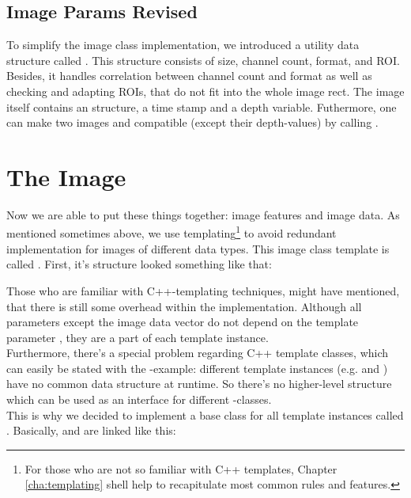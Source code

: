 \subsection {Image Params Revised}
To simplify the image class implementation, we introduced a utility data structure called  . This structure consists of size, channel count, format, and ROI. Besides, it handles correlation between channel count and format as well as checking and adapting ROIs, that do not fit into the whole image rect. The image itself contains an  structure, a time stamp and a depth variable. Futhermore, one can make two images  and  compatible (except their depth-values) by calling .


\section{The Image}
Now we are able to put these things together: image features and image data. As mentioned sometimes above, we use templating\footnote{For those who are not so familiar with C++ templates, Chapter \ref{cha:templating} shell help to recapitulate most common rules and features.} to avoid redundant implementation for images of different data types. This image class template is called  . First, it's structure looked something like that:


Those who are familiar with C++-templating techniques, might have mentioned, that there is still some overhead within the implementation. Although all parameters except the image data vector do not depend on the template parameter , they are a part of each template instance.\\
Furthermore, there's a special problem regarding C++ template classes, which can easily be stated with the -example: different template instances (e.g.  and ) have no common data structure at runtime. So there's no higher-level structure which can be used as an interface for different -classes.\\
This is why we decided to implement a base class for all  template instances called  . Basically,  and  are linked like this:

